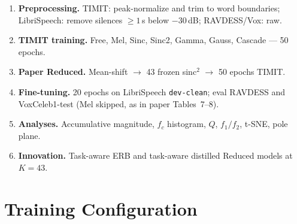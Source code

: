 \documentclass[11pt,a4paper]{article}
\begin{document}
\begin{enumerate}[leftmargin=1.6em,itemsep=0.35em]
  \item \textbf{Preprocessing.} TIMIT: peak-normalize and trim to word boundaries; LibriSpeech: remove silences $\ge 1$\,s below $-30$\,dB; RAVDESS/Vox: raw.
  \item \textbf{TIMIT training.} Free, Mel, Sinc, Sinc2, Gamma, Gauss, Cascade --- 50 epochs.
  \item \textbf{Paper Reduced.} Mean-shift $\to$ 43 frozen sinc$^2$ $\to$ 50 epochs TIMIT.
  \item \textbf{Fine-tuning.} 20 epochs on LibriSpeech \texttt{dev-clean}; eval RAVDESS and VoxCeleb1-test (Mel skipped, as in paper Tables~7--8).
  \item \textbf{Analyses.} Accumulative magnitude, $f_c$ histogram, $Q$, $f_1/f_2$, t-SNE, pole plane.
  \item \textbf{Innovation.} Task-aware ERB and task-aware distilled Reduced models at $K{=}43$.
\end{enumerate}

\section{Training Configuration}
\end{document}

